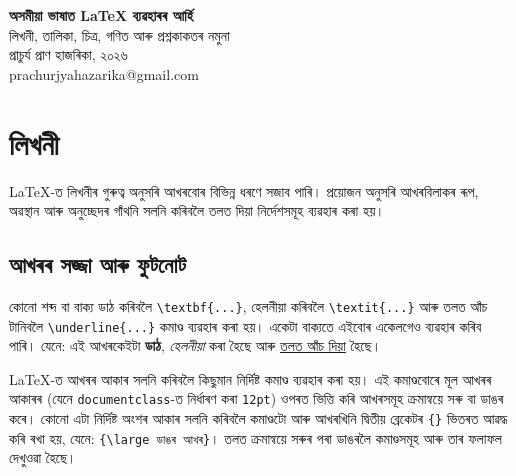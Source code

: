 \documentclass[12pt,a4paper]{article} %
\begin{document}
	
	\begin{center}
		{\huge\bfseries অসমীয়া ভাষাত \LaTeX{} ব্যৱহাৰৰ আৰ্হি}\\
		\vspace{0.2cm}
		{\large লিখনী, তালিকা, চিত্ৰ, গণিত আৰু প্ৰশ্নকাকতৰ নমুনা}\\
		\vspace{0.15cm}
		{\normalsize প্ৰাচুৰ্য প্ৰাণ হাজৰিকা, ২০২৬}\\
		{\small prachurjyahazarika@gmail.com}
		
	\end{center}
	
	\begin{abstract}
		অসমীয়া ভাষাত \LaTeX{} ব্যৱহাৰ কৰাৰ এটা সৰল আৰ্হি। ইয়াত সাধাৰণ লিখনী, তালিকা, লিংক, চিত্ৰ, গণিতৰ সমীকৰণ, তালিকা আৰু প্ৰশ্নকাকত সাজিবলৈ প্ৰয়োজন হোৱা মূল সঁজুলিবোৰ দেখুওৱা হৈছে। PDF-টো XeLaTeX-ৰ জৰিয়তে কম্পাইল কৰা হৈছে, যাতে অসমীয়া Unicode আখৰ আৰু সংখ্যা পোনপটীয়াকৈ লিখিব পাৰি।
	\end{abstract}
	
	\section{লিখনী}
	
	\LaTeX{}-ত লিখনীৰ গুৰুত্ব অনুসৰি আখৰবোৰ বিভিন্ন ধৰণে সজাব পাৰি। প্ৰয়োজন অনুসৰি আখৰবিলাকৰ ৰূপ, অৱস্থান আৰু অনুচ্ছেদৰ গাঁথনি সলনি কৰিবলৈ তলত দিয়া নিৰ্দেশসমূহ ব্যৱহাৰ কৰা হয়।
	
	\subsection{আখৰৰ সজ্জা আৰু ফুটনোট}
	
	কোনো শব্দ বা বাক্য ডাঠ কৰিবলৈ \texttt{\textbackslash textbf\{...\}}, হেলনীয়া কৰিবলৈ \texttt{\textbackslash textit\{...\}} আৰু তলত আঁচ টানিবলৈ \texttt{\textbackslash underline\{...\}} কমাণ্ড ব্যৱহাৰ কৰা হয়। একেটা বাক্যতে এইবোৰ একেলগেও ব্যৱহাৰ কৰিব পাৰি। যেনে: এই আখৰকেইটা \textbf{ডাঠ}, \textit{হেলনীয়া} কৰা হৈছে আৰু \underline{তলত আঁচ দিয়া} হৈছে।
	
	\LaTeX{}-ত আখৰৰ আকাৰ সলনি কৰিবলৈ কিছুমান নিৰ্দিষ্ট কমাণ্ড ব্যৱহাৰ কৰা হয়। এই কমাণ্ডবোৰে মূল আখৰৰ আকাৰৰ (যেনে \texttt{documentclass}-ত নিৰ্ধাৰণ কৰা \texttt{12pt}) ওপৰত ভিত্তি কৰি আখৰসমূহ ক্ৰমান্বয়ে সৰু বা ডাঙৰ কৰে। কোনো এটা নিৰ্দিষ্ট অংশৰ আকাৰ সলনি কৰিবলৈ কমাণ্ডটো আৰু আখৰখিনি দ্বিতীয় ব্ৰেকেটৰ \texttt{\{\}} ভিতৰত আৱদ্ধ কৰি ৰখা হয়, যেনে: \texttt{\{\textbackslash large \textnormal{ডাঙৰ আখৰ}\}}। তলত ক্ৰমান্বয়ে সৰুৰ পৰা ডাঙৰলৈ কমাণ্ডসমূহ আৰু তাৰ ফলাফল দেখুওৱা হৈছে।
	
\end{document}
